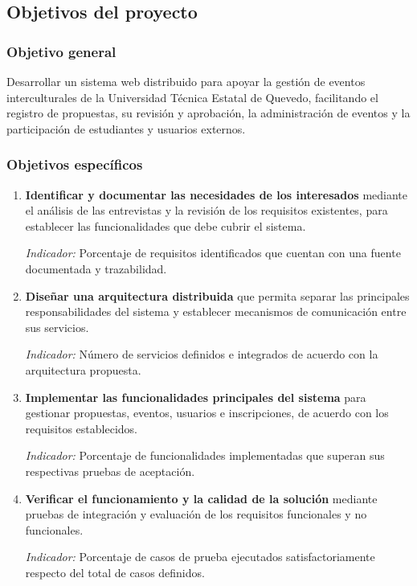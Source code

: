 \subsection{Objetivos del proyecto}

\subsubsection{Objetivo general}

Desarrollar un sistema web distribuido para apoyar la gestión de eventos interculturales de la Universidad Técnica Estatal de Quevedo, facilitando el registro de propuestas, su revisión y aprobación, la administración de eventos y la participación de estudiantes y usuarios externos.

\subsubsection{Objetivos específicos}

\begin{enumerate}

    \item \textbf{Identificar y documentar las necesidades de los interesados} mediante el análisis de las entrevistas y la revisión de los requisitos existentes, para establecer las funcionalidades que debe cubrir el sistema.

    \textit{Indicador:} Porcentaje de requisitos identificados que cuentan con una fuente documentada y trazabilidad.

    \item \textbf{Diseñar una arquitectura distribuida} que permita separar las principales responsabilidades del sistema y establecer mecanismos de comunicación entre sus servicios.

    \textit{Indicador:} Número de servicios definidos e integrados de acuerdo con la arquitectura propuesta.

    \item \textbf{Implementar las funcionalidades principales del sistema} para gestionar propuestas, eventos, usuarios e inscripciones, de acuerdo con los requisitos establecidos.

    \textit{Indicador:} Porcentaje de funcionalidades implementadas que superan sus respectivas pruebas de aceptación.

    \item \textbf{Verificar el funcionamiento y la calidad de la solución} mediante pruebas de integración y evaluación de los requisitos funcionales y no funcionales.

    \textit{Indicador:} Porcentaje de casos de prueba ejecutados satisfactoriamente respecto del total de casos definidos.

\end{enumerate}


